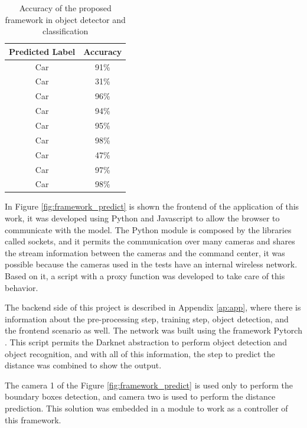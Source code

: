 \begin{table}[H]
\centering
\caption{Accuracy of the proposed framework in object detector and classification}
\begin{tabular}{c|c}
\hline
Predicted Label & Accuracy \\ \hline
Car             & 91\%     \\ \hline
Car             & 31\%     \\ \hline
Car             & 96\%     \\ \hline
Car             & 94\%     \\ \hline
Car             & 95\%     \\ \hline
Car             & 98\%     \\ \hline
Car             & 47\%     \\ \hline
Car             & 97\%     \\ \hline
Car             & 98\%     \\ \hline
\end{tabular}
\label{tab:accuracy}
\end{table}



In Figure \ref{fig:framework_predict} is shown the frontend of the application of this work, it was developed using Python and Javascript to allow the browser to communicate with the model. The Python module is composed by the libraries called sockets, and it permits the communication over many cameras and shares the stream information between the cameras and the command center, it was possible because the cameras used in the tests have an internal wireless network. Based on it, a script with a proxy function was developed to take care of this behavior. 

The backend side of this project is described in Appendix \ref{ap:app}, where there is information about the pre-processing step, training step, object detection, and the frontend scenario as well. The network was built using the framework Pytorch \cite{paszke2019pytorch}. This script permits the Darknet abstraction to perform object detection and object recognition, and with all of this information, the step to predict the distance was combined to show the output. 

The camera 1 of the Figure \ref{fig:framework_predict} is used only to perform the boundary boxes detection, and camera two is used to perform the distance prediction. This solution was embedded in a module to work as a controller of this framework.

